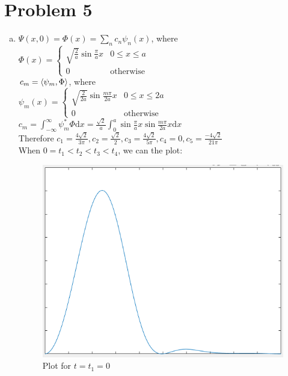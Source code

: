 \documentclass[a4paper]{article}
\begin{document}
\section{Problem 5}
\begin{enumerate}[(a)]
    \item $\Psi(x,0)=\Phi(x)=\sum_nc_n\psi_n(x)$, where 
    \\$\Phi(x)=\begin{cases}
        \sqrt{\frac{2}{a}}\sin\frac{\pi}{a}x &0\leq x\leq a\\
        0 &\mathrm{otherwise}
    \end{cases}$
    \\$c_m=\braket{\psi_m,\Phi}$, where
    \\$\psi_m(x)=\begin{cases}
        \sqrt{\frac{2}{2a}}\sin\frac{m\pi}{2a}x &0\leq x\leq 2a\\
        0 &\mathrm{otherwise}
    \end{cases}$
    \\$c_m=\int_{-\infty}^{\infty}\psi_m^*\Phi\mathrm{d}x=\frac{\sqrt{2}}{a}\int_0^a\sin\frac{\pi}{a}x\sin\frac{m\pi}{2a}x\mathrm{d}x$
    \\Therefore $c_1=\frac{4\sqrt{2}}{3\pi},c_2=\frac{\sqrt{2}}{2},c_3=\frac{4\sqrt{2}}{5\pi},c_4=0,c_5=\frac{-4\sqrt{2}}{21\pi}$
    \\When $0=t_1<t_2<t_3<t_4$, we can the plot:
    \begin{figure}[H]
        \centering
        \includegraphics[scale=0.5]{P1.png}
        \caption{Plot for $t=t_1=0$}

\end{figure}
\end{enumerate}
\end{document}

